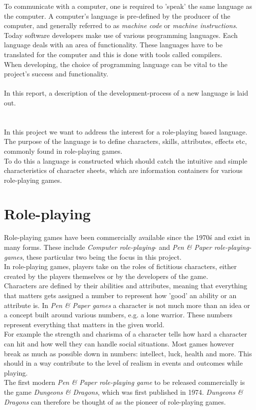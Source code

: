 
To communicate with a computer, one is required to 'speak' the same language as the computer. A computer's language is pre-defined by the producer of the computer, and generally referred to as \emph{machine code} or \emph{machine instructions}.\\
Today software developers make use of various programming languages. Each language deals with an area of functionality. These languages have to be translated for the computer and this is done with tools called compilers.\\
When developing, the choice of programming language can be vital to the project's success and functionality.\\\\
In this report, a description of the development-process of a new language is laid out.

\section{\langname{}}
In this project we want to address the interest for a role-playing based language. The purpose of the language is to define characters, skills, attributes, effects etc, commonly found in role-playing games.\\
To do this a language is constructed which should catch the intuitive and simple characteristics of character sheets, which are information containers for various role-playing games.

\section{Role-playing}
Role-playing games have been commercially available since the 1970\'s and exist in many forms.
These include \emph{Computer role-playing}- and \emph{Pen \& Paper role-playing-games}, these particular two being the focus in this project.\\
In role-playing games, players take on the roles of fictitious characters, either created by the players themselves or by the developers of the game.\\
Characters are defined by their abilities and attributes, meaning that everything that matters gets assigned a number to represent how 'good' an ability or an attribute is. In \emph{Pen \& Paper games} a character is not much more than an idea or a concept built around various numbers, e.g. a lone warrior. These numbers represent everything that matters in the given world.\\ For example the strength and charisma of a character tells how hard a character can hit and how well they can handle social situations. Most games however break as much as possible down in numbers: intellect, luck, health and more.
This should in a way contribute to the level of realism in events and outcomes while playing.\\
The first modern \emph{Pen \& Paper role-playing game} to be released commercially is the game \emph{Dungeons \& Dragons}, which was first published in 1974.\cite{wikidnd}
\emph{Dungeons \& Dragons} can therefore be thought of as the pioneer of role-playing games.

